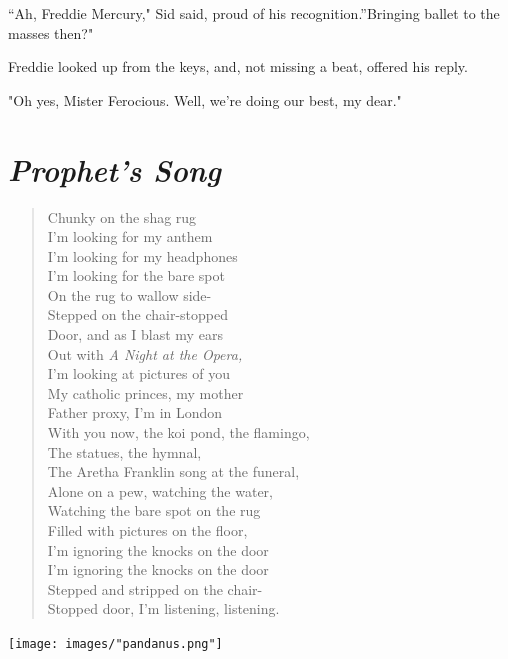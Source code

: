 \documentclass[
]{memoir}
\begin{document}
``Ah, Freddie Mercury," Sid said, proud of his recognition.''Bringing
ballet to the masses then?"

Freddie looked up from the keys, and, not missing a beat, offered his
reply.

"Oh yes, Mister Ferocious. Well, we're doing our best, my dear."

\hypertarget{prophets-song}{%
\section*{\texorpdfstring{\emph{Prophet's
Song}}{Prophet's Song}}\label{prophets-song}}

\begin{verse}
Chunky on the shag rug\\
I’m looking for my anthem\\
I’m looking for my headphones\\
I’m looking for the bare spot\\
On the rug to wallow side-\\
Stepped on the chair-stopped\\
Door, and as I blast my ears\\
Out with \emph{A Night at the Opera,}\\
I’m looking at pictures of you\\
My catholic princes, my mother\\
Father proxy, I’m in London\\
With you now, the koi pond, the flamingo,\\
The statues, the hymnal,\\
The Aretha Franklin song at the funeral,\\
Alone on a pew, watching the water,\\
Watching the bare spot on the rug\\
Filled with pictures on the floor,\\
I’m ignoring the knocks on the door\\
I’m ignoring the knocks on the door\\
Stepped and stripped on the chair-\\
Stopped door, I’m listening, listening.\\
\end{verse}

\begin{center}\texttt{[image: images/"pandanus.png"]}\end{center}
\end{document}
